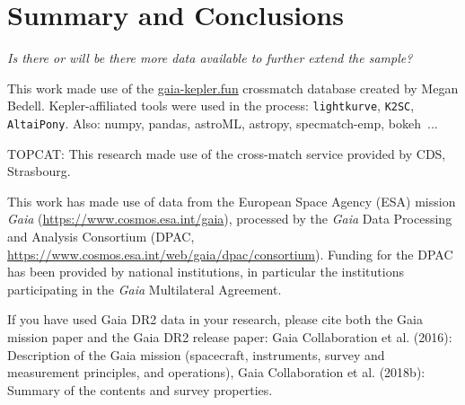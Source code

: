 \documentclass{aa}
\begin{document}
\section{Summary and Conclusions}
\textit{Is there or will be there more data available to further extend the sample? }
\begin{acknowledgements}
This work made use of the \url{gaia-kepler.fun} crossmatch database created by Megan Bedell.
Kepler-affiliated tools were used in the process: \texttt{lightkurve}, \texttt{K2SC}, \texttt{AltaiPony}.
Also: numpy, pandas, astroML, astropy, specmatch-emp, bokeh~\citep{bokeh}...

TOPCAT: This research made use of the cross-match service provided by CDS, Strasbourg.

This work has made use of data from the European Space Agency (ESA) mission
{\it Gaia} (\url{https://www.cosmos.esa.int/gaia}), processed by the {\it Gaia}
Data Processing and Analysis Consortium (DPAC,
\url{https://www.cosmos.esa.int/web/gaia/dpac/consortium}). Funding for the DPAC
has been provided by national institutions, in particular the institutions
participating in the {\it Gaia} Multilateral Agreement.

If you have used Gaia DR2 data in your research, please cite both the Gaia mission paper and the Gaia DR2 release paper:
Gaia Collaboration et al. (2016): Description of the Gaia mission (spacecraft, instruments, survey and measurement principles, and operations), Gaia Collaboration et al. (2018b): Summary of the contents and survey properties.


\end{acknowledgements}

\end{document}
